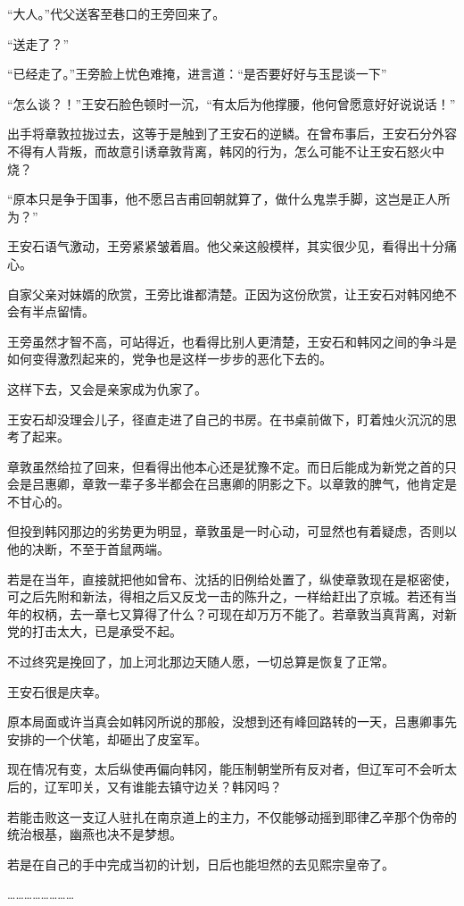 “大人。”代父送客至巷口的王旁回来了。

“送走了？”

“已经走了。”王旁脸上忧色难掩，进言道：“是否要好好与玉昆谈一下”

“怎么谈？！”王安石脸色顿时一沉，“有太后为他撑腰，他何曾愿意好好说说话！”

出手将章敦拉拢过去，这等于是触到了王安石的逆鳞。在曾布事后，王安石分外容不得有人背叛，而故意引诱章敦背离，韩冈的行为，怎么可能不让王安石怒火中烧？

“原本只是争于国事，他不愿吕吉甫回朝就算了，做什么鬼祟手脚，这岂是正人所为？”

王安石语气激动，王旁紧紧皱着眉。他父亲这般模样，其实很少见，看得出十分痛心。

自家父亲对妹婿的欣赏，王旁比谁都清楚。正因为这份欣赏，让王安石对韩冈绝不会有半点留情。

王旁虽然才智不高，可站得近，也看得比别人更清楚，王安石和韩冈之间的争斗是如何变得激烈起来的，党争也是这样一步步的恶化下去的。

这样下去，又会是亲家成为仇家了。

王安石却没理会儿子，径直走进了自己的书房。在书桌前做下，盯着烛火沉沉的思考了起来。

章敦虽然给拉了回来，但看得出他本心还是犹豫不定。而日后能成为新党之首的只会是吕惠卿，章敦一辈子多半都会在吕惠卿的阴影之下。以章敦的脾气，他肯定是不甘心的。

但投到韩冈那边的劣势更为明显，章敦虽是一时心动，可显然也有着疑虑，否则以他的决断，不至于首鼠两端。

若是在当年，直接就把他如曾布、沈括的旧例给处置了，纵使章敦现在是枢密使，可之后先附和新法，得相之后又反戈一击的陈升之，一样给赶出了京城。若还有当年的权柄，去一章七又算得了什么？可现在却万万不能了。若章敦当真背离，对新党的打击太大，已是承受不起。

不过终究是挽回了，加上河北那边天随人愿，一切总算是恢复了正常。

王安石很是庆幸。

原本局面或许当真会如韩冈所说的那般，没想到还有峰回路转的一天，吕惠卿事先安排的一个伏笔，却砸出了皮室军。

现在情况有变，太后纵使再偏向韩冈，能压制朝堂所有反对者，但辽军可不会听太后的，辽军叩关，又有谁能去镇守边关？韩冈吗？

若能击败这一支辽人驻扎在南京道上的主力，不仅能够动摇到耶律乙辛那个伪帝的统治根基，幽燕也决不是梦想。

若是在自己的手中完成当初的计划，日后也能坦然的去见熙宗皇帝了。

……………………

